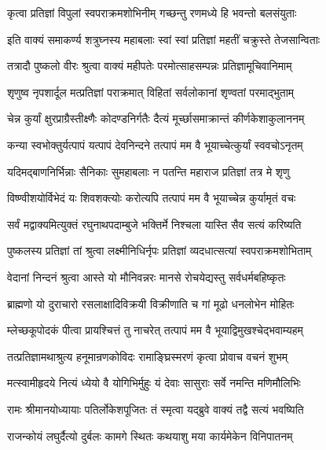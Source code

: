 \twolineshloka
{कृत्वा प्रतिज्ञां विपुलां स्वपराक्रमशोभिनीम्}
{गच्छन्तु रणमध्ये हि भवन्तो बलसंयुताः}%

\twolineshloka
{इति वाक्यं समाकर्ण्य शत्रुघ्नस्य महाबलाः}
{स्वां स्वां प्रतिज्ञां महतीं चक्रुस्ते तेजसान्विताः}%

\twolineshloka
{तत्रादौ पुष्कलो वीरः श्रुत्वा वाक्यं महीपतेः}
{परमोत्साहसम्पन्नः प्रतिज्ञामूचिवानिमाम्}%


\twolineshloka
{शृणुष्व नृपशार्दूल मत्प्रतिज्ञां पराक्रमात्}
{विहितां सर्वलोकानां शृण्वतां परमाद्भुताम्}%

\twolineshloka
{चेन्न कुर्यां क्षुरप्राग्रैस्तीक्ष्णैः कोदण्डनिर्गतैः}
{दैत्यं मूर्च्छासमाक्रान्तं कीर्णकेशाकुलाननम्}%

\twolineshloka
{कन्या स्वभोक्तुर्यत्पापं यत्पापं देवनिन्दने}
{तत्पापं मम वै भूयाच्चेत्कुर्यां स्ववचोऽनृतम्}%

\twolineshloka
{यदिमद्बाणनिर्भिन्नाः सैनिकाः सुमहाबलाः}
{न पतन्ति महाराज प्रतिज्ञां तत्र मे शृणु}%

\twolineshloka
{विष्ण्वीशयोर्विभेदं यः शिवशक्त्योः करोत्यपि}
{तत्पापं मम वै भूयाच्चेन्न कुर्यामृतं वचः}%

\twolineshloka
{सर्वं मद्वाक्यमित्युक्तं रघुनाथपदाम्बुजे}
{भक्तिर्मे निश्चला यास्ति सैव सत्यं करिष्यति}%

\twolineshloka
{पुष्कलस्य प्रतिज्ञां तां श्रुत्वा लक्ष्मीनिधिर्नृपः}
{प्रतिज्ञां व्यदधात्सत्यां स्वपराक्रमशोभिताम्}%


\twolineshloka
{वेदानां निन्दनं श्रुत्वा आस्ते यो मौनिवन्नरः}
{मानसे रोचयेद्यस्तु सर्वधर्मबहिष्कृतः}%

\twolineshloka
{ब्राह्मणो यो दुराचारो रसलाक्षादिविक्रयी}
{विक्रीणाति च गां मूढो धनलोभेन मोहितः}%

\twolineshloka
{म्लेच्छकूपोदकं पीत्वा प्रायश्चित्तं तु नाचरेत्}
{तत्पापं मम वै भूयाद्विमुखश्चेद्भवाम्यहम्}%

\twolineshloka
{तत्प्रतिज्ञामथाश्रुत्य हनूमान्रणकोविदः}
{रामाङ्घ्रिस्मरणं कृत्वा प्रोवाच वचनं शुभम्}%

\twolineshloka
{मत्स्वामीहृदये नित्यं ध्येयो वै योगिभिर्मुहुः}
{यं देवाः सासुराः सर्वे नमन्ति मणिमौलिभिः}%

\twolineshloka
{रामः श्रीमानयोध्यायाः पतिर्लोकेशपूजितः}
{तं स्मृत्वा यद्ब्रुवे वाक्यं तद्वै सत्यं भवष्यिति}%

\twolineshloka
{राजन्कोयं लघुर्दैत्यो दुर्बलः कामगे स्थितः}
{कथयाशु मया कार्यमेकेन विनिपातनम्}%

